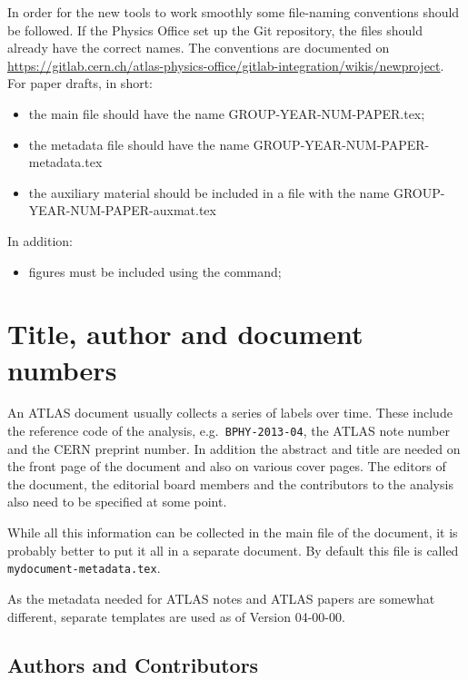 In order for the new tools to work smoothly some file-naming conventions should be followed.
If the Physics Office set up the Git repository, the files should already have the correct names.
The conventions are documented on
\url{https://gitlab.cern.ch/atlas-physics-office/gitlab-integration/wikis/newproject}.
For paper drafts, in short:
\begin{itemize}
  \item the main file should have the name GROUP-YEAR-NUM-PAPER.tex;
  \item the metadata file should have the name GROUP-YEAR-NUM-PAPER-metadata.tex
  \item the auxiliary material should be included in a file with the name GROUP-YEAR-NUM-PAPER-auxmat.tex
\end{itemize}

In addition:
\begin{itemize}
  \item figures must be included using the  command;
\end{itemize}

\section{Title, author and document numbers}
\label{sec:metadata}

An ATLAS document usually collects a series of labels over time.
These include the reference code of the analysis, e.g.\ \texttt{BPHY-2013-04}, 
the ATLAS note number and the CERN preprint number.
In addition the abstract and title are needed on the front page of the document and also on various cover pages.
The editors of the document, the editorial board members and the contributors to the analysis
also need to be specified at some point.

While all this information can be collected in the main file of the document, 
it is probably better to put it all in a separate document.
By default this file is called \texttt{mydocument-metadata.tex}.

As the metadata needed for ATLAS notes and ATLAS papers are somewhat different,
separate templates are used as of Version 04-00-00.


\subsection{Authors and Contributors}
\label{sec:contribute}

